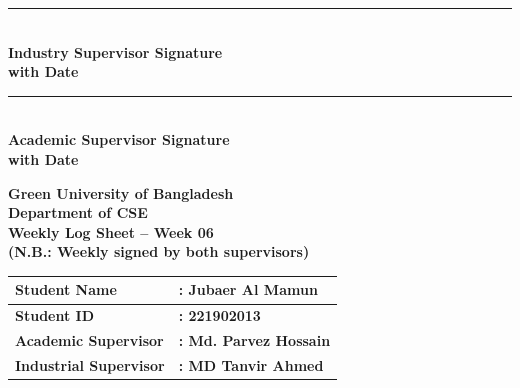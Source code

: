 \documentclass[a4paper,11pt]{article}
\begin{document}
\noindent
\begin{minipage}[t]{0.45\textwidth}
\rule{0.8\textwidth}{0.4pt} \\
\textbf{Industry Supervisor Signature} \\
\textbf{with Date}
\end{minipage}
\hfill
\begin{minipage}[t]{0.45\textwidth}
\rule{0.8\textwidth}{0.4pt} \\
\textbf{Academic Supervisor Signature} \\
\textbf{with Date}
\end{minipage}

\newpage

\begin{center}
    {\Large \textbf{Green University of Bangladesh}} \\[0.5em]
    {\large \textbf{Department of CSE}} \\[0.5em]
    {\large \textbf{Weekly Log Sheet -- Week 06}} \\[0.5em]
    {\color{red} \textbf{(N.B.: Weekly signed by both supervisors)}}
\end{center}

\vspace{1em}

\begin{tabularx}{\textwidth}{|l|X|}
\hline
\textbf{Student Name} & \textbf{: Jubaer Al Mamun} \\ \hline
\textbf{Student ID} & \textbf{: 221902013} \\ \hline
\textbf{Academic Supervisor} & \textbf{: Md. Parvez Hossain} \\ \hline
\textbf{Industrial Supervisor} & \textbf{: MD Tanvir Ahmed} \\ \hline
\end{tabularx}

\vspace{1em}
\end{document}
